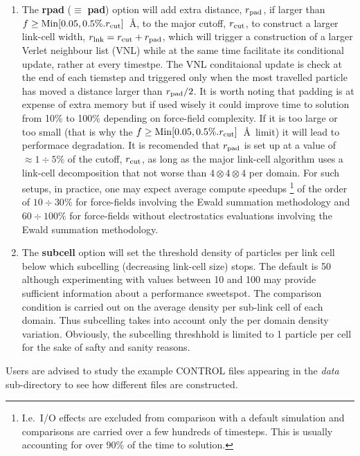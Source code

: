 \begin{enumerate}
\item The {\bf rpad} ($\equiv$ {\bf pad}) option will add extra distance,
$r_{\rm pad}$, if larger than $f \ge {\rm Min}[0.05,0.5\%.r_{\rm cut}]$~\AA,
to the major cutoff, $r_{\rm cut}$, to construct a larger link-cell width,
$r_{\rm lnk}=r_{\rm cut}+r_{\rm pad}$, which will trigger a construction of
a larger Verlet neighbour list (VNL) while at the same time facilitate its
conditional update, rather at every timestpe.  The VNL conditaional update
is check at the end of each tiemstep and triggered only when the most
travelled particle has moved a distance larger than $r_{\rm pad}/2$.  It is
worth noting that padding is at expense of extra memory but if used wisely
it could improve time to solution from 10\% to 100\% depending on force-field
complexity.  If it is too large or too small (that is why the
$f \ge {\rm Min}[0.05,0.5\%.r_{\rm cut}]$~\AA~limit) it will lead to
performace degradation.  It is recomended that $r_{\rm pad}$ is set up at a
value of $\approx 1 \div 5\%$ of the cutoff, $r_{\rm cut}$, as long as the
major link-cell algorithm uses a link-cell decomposition that not worse than
$4 \otimes 4 \otimes 4$ per domain.  For such setups, in practice, one
may expect average compute speedups \footnote{I.e.~I/O effects are excluded
from comparison with a default simulation and comparisons are carried over
a few hundreds of timesteps.  This is usually accounting for over $90\%$ of
the time to solution.} of the order of $10 \div 30\%$ for force-fields
involving the Ewald summation methodology and $60 \div 100\%$ for force-fields
without electrostatics evaluations involving the Ewald summation methodology.

\item The {\bf subcell} option will set the threshold density of particles
per link cell below which subcelling (decreasing link-cell size) stops.  The
default is 50 although experimenting with values between 10 and 100 may
provide sufficient information about a performance sweetspot.  The comparison
condition is carried out on the average density per sub-link cell of each
domain.  Thus subcelling takes into account only the per domain density
variation.  Obviously, the subcelling threshhold is limited to 1 particle per
cell for the sake of safty and sanity reasons.
\end{enumerate}

\noindent Users are advised to study the example CONTROL files
appearing in the {\em data} sub-directory to see how different
files are constructed.

